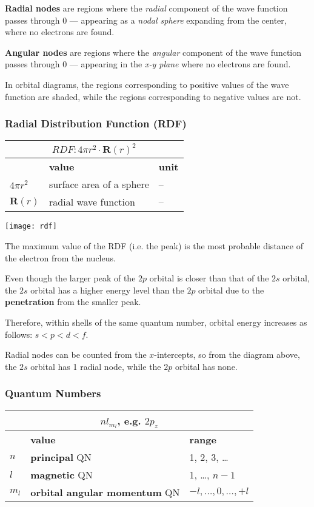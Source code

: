 \textbf{Radial nodes} are regions where the \textit{radial} component of the wave function passes through 0
--- appearing as a \emph{nodal sphere} expanding from the center, where no electrons are found.

\textbf{Angular nodes} are regions where the \textit{angular} component of the wave function passes through 0
--- appearing in the \emph{x-y plane} where no electrons are found.

In orbital diagrams, the regions corresponding to positive values of the wave function are shaded,
while the regions corresponding to negative values are not.

\subsubsection{Radial Distribution Function (RDF)}
\begin{tabularx}{\linewidth}{|l|X|l|} \hline
    \multicolumn{3}{|c|}{$RDF: 4 \pi r^2 \cdot \mathbf{R}(r)^2$ } \\ \hline
    & \textbf{value} & \textbf{unit} \\ \hline
    $4 \pi r^2$ & surface area of a sphere & -- \\
    $\mathbf{R}(r)$ & radial wave function & -- \\ \hline
\end{tabularx}

\vspace*{1em}
\texttt{[image: rdf]}

The maximum value of the RDF (i.e. the peak) is the most probable distance of the electron
from the nucleus.

Even though the larger peak of the $2p$ orbital is closer than that of the $2s$ orbital,
the $2s$ orbital has a higher energy level than the $2p$ orbital due to the \textbf{penetration}
from the smaller peak.

Therefore, within shells of the same quantum number, orbital energy increases as follows:
 $s < p < d < f$.

 Radial nodes can be counted from the $x$-intercepts, so from the diagram above,
 the $2s$ orbital has 1 radial node, while the $2p$ orbital has none.

 \subsubsection{Quantum Numbers}
 \begin{tabularx}{\linewidth}{|l|X|X|} \hline
    \multicolumn{3}{|c|}{$nl_{m_l}$, e.g. $2p_z$} \\ \hline
    & \textbf{value} & \textbf{range} \\ \hline
    $n$ & \textbf{principal} QN & 1, 2, 3, \dots \\
    $l$ & \textbf{magnetic} QN & 1, \dots, $n-1$ \\
    $m_l$ & \textbf{orbital angular momentum} QN & $-l, \dots, 0, \dots, +l$ \\ \hline
\end{tabularx}

